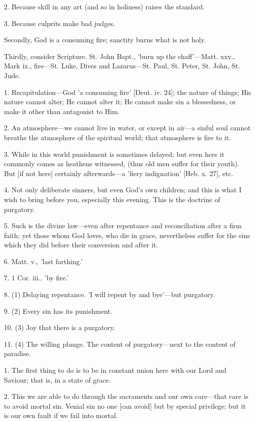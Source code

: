 2. Because skill in any art (and so in holiness)
raises the standard.

3. Because culprits make bad judges.

Secondly, God is a consuming fire; sanctity burns
what is not holy.

Thirdly, consider Scripture. St. John Bapt.,
'burn up the chaff'—Matt. xxv., Mark ix., fire—St. Luke, Dives and
Lazarus—St. Paul, St. Peter, St. John, St. Jude.


1. Recapitulation—God 'a consuming fire' [Deut.
iv. 24]; the nature of things; His nature cannot alter; He cannot
alter it; He cannot make sin a blessedness, or make it other than
antagonist to Him.

2. An atmosphere—we cannot live in water, or
except in air—a sinful soul cannot breathe the atmosphere of the
spiritual world; that atmosphere is fire to it.

3. While in this world punishment is sometimes
delayed; but even here it commonly comes as heathens witnessed, (thus
old men suffer for their youth). But [if not here] certainly
afterwards—a 'fiery indignation' [Heb. x. 27], etc.

4. Not only deliberate sinners, but even God's
own children; and this is what I wish to bring before you,
especially this evening. This is the doctrine of purgatory.

5. Such is the divine law—even after repentance
and reconciliation after a firm faith; yet those whom God loves, who
die in grace, nevertheless suffer for the sins which they did before
their conversion and after it.

6. Matt. v., 'last farthing.'

7. 1 Cor. iii., 'by fire.'

8. (1) Delaying repentance. 'I will repent by and
bye'—but purgatory.

9. (2) Every sin has its punishment.

10. (3) Joy that there is a purgatory.

11. (4) The willing plunge. The content of
purgatory—next to the content of paradise.


1. The first thing to do is to be in constant
union here with our Lord and Saviour; that is, in a state of grace.

2. This we are able to do through the sacraments
and our own care—that care is to avoid mortal sin. Venial sin no one
[can avoid] but by special privilege; but it is our own fault if we
fail into mortal.


